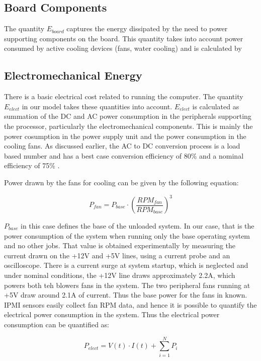 \documentclass[times, 10pt,onecolumn]{article}
\begin{document}
\subsection{Board Components}
\label{sec:board}
The quantity $E_{board}$ captures the energy dissipated by the need to
power supporting components on the board.  This quantity takes into
account power consumed by active cooling devices (fans, water cooling)
and is calculated by

\subsection{Electromechanical Energy}
\label{sec:electrical}
There is a basic electrical cost related to running the computer. The
quantity $E_{elect}$ in our model takes these quantities into account.
$E_{elect}$ is calculated as summation of the DC and AC power
consumption in the peripherals supporting the processor, particularly
the electromechanical components. This is mainly the power cosumption in
the power supply unit and the power consumption in the cooling fans.
As discussed earlier, the AC to DC conversion process is a load based number and
has a best case conversion efficiency of 80\% and a nominal efficiency of 75\% .

Power drawn by the fans for cooling can be given by the following equation:

\begin{equation}
\label{eq:fanp}
P_{fan}=  P_{base} \cdot (\frac{RPM_{fan}}{RPM_{base}})^3
\end{equation} 

$P_{base}$ in this case defines the base of the unloaded system. In our
case, that is the power consumption of the system when running only the
base operating system and no other jobs. That value is obtained
experimentally by measuring the current drawn on the +12V and +5V lines,
using a current probe and an oscilloscope. There is a current surge at
system startup, which is neglected and under nominal conditions, the
+12V line draws approximately 2.2A, which powers both teh blowers fans
in the system. The two peripheral fans running at +5V draw around 2.1A
of current.  Thus the base power for the fans in known.  IPMI sensors
easily collect fan RPM data, and hence it is possible to quantify the
electrical power consumption in the system. Thus the electrical power
consumption can be quantified as:

\begin{equation}
\label{eq:elect}
P_{elect}=  V(t) \cdot I(t) + \sum_{i=1}^NP_{i}
\end{equation} 
\end{document}
